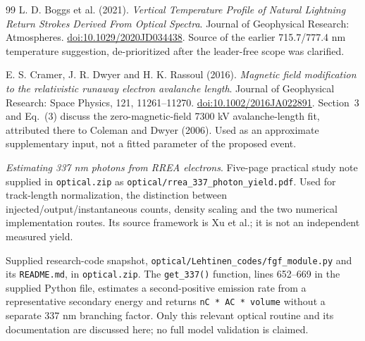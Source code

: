 \documentclass[11pt,a4paper]{article}
\begin{document}
\begin{thebibliography}{99}
L. D. Boggs et al. (2021).
\emph{Vertical Temperature Profile of Natural Lightning Return Strokes Derived From Optical Spectra}.
Journal of Geophysical Research: Atmospheres.
\href{https://doi.org/10.1029/2020JD034438}{doi:10.1029/2020JD034438}.
Source of the earlier 715.7/777.4 nm temperature suggestion, de-prioritized after the leader-free scope was clarified.

E. S. Cramer, J. R. Dwyer and H. K. Rassoul (2016).
\emph{Magnetic field modification to the relativistic runaway electron avalanche length}.
Journal of Geophysical Research: Space Physics, 121, 11261--11270.
\href{https://doi.org/10.1002/2016JA022891}{doi:10.1002/2016JA022891}.
Section~3 and Eq.~(3) discuss the zero-magnetic-field 7300 kV avalanche-length fit, attributed there to Coleman and Dwyer (2006). Used as an approximate supplementary input, not a fitted parameter of the proposed event.

\emph{Estimating 337 nm photons from RREA electrons}.
Five-page practical study note supplied in \texttt{optical.zip} as
\texttt{optical/rrea\_337\_photon\_yield.pdf}.
Used for track-length normalization, the distinction between injected/output/instantaneous counts, density scaling and the two numerical implementation routes. Its source framework is Xu et al.; it is not an independent measured yield.

Supplied research-code snapshot, \texttt{optical/Lehtinen\_codes/fgf\_module.py} and its \texttt{README.md}, in \texttt{optical.zip}.
The \texttt{get\_337()} function, lines 652--669 in the supplied Python file, estimates a second-positive emission rate from a representative secondary energy and returns \texttt{nC * AC * volume} without a separate 337 nm branching factor. Only this relevant optical routine and its documentation are discussed here; no full model validation is claimed.
\end{thebibliography}
\endgroup
\end{document}
